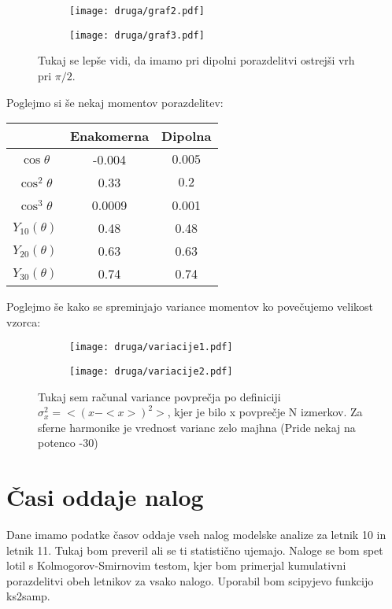 \documentclass{article}
\begin{document}
\begin{figure}[H]
\centering
\begin{subfigure}{.49\textwidth}
\texttt{[image: druga/graf2.pdf]}
\end{subfigure}
\begin{subfigure}{.49\textwidth}
\texttt{[image: druga/graf3.pdf]}
\end{subfigure}
\caption*{Tukaj se lepše vidi, da imamo pri dipolni porazdelitvi ostrejši vrh pri $\pi/2$.}
\end{figure}

Poglejmo si še nekaj momentov porazdelitev:
\begin{center}
\begin{tabular}{|c|c|c|}
\hline
& Enakomerna & Dipolna \\ \hline
$\cos\theta$ & -0.004 & $0.005$\\ \hline
$\cos^2\theta$ & 0.33& $0.2$\\ \hline
$\cos^3\theta$ & 0.0009 &0.001\\ \hline
$Y_{10}(\theta)$ & 0.48 & 0.48\\ \hline
$Y_{20}(\theta)$ & 0.63 & 0.63\\ \hline
$Y_{30}(\theta)$ & 0.74 & 0.74 \\ \hline
\end{tabular}
\end{center}

Poglejmo še kako se spreminjajo variance momentov ko povečujemo velikost vzorca:

\begin{figure}[H]
\centering
\begin{subfigure}{.49\textwidth}
\texttt{[image: druga/variacije1.pdf]}
\end{subfigure}
\begin{subfigure}{.49\textwidth}
\texttt{[image: druga/variacije2.pdf]}
\end{subfigure}
\caption*{Tukaj sem računal variance povprečja po definiciji $\sigma^2_x = <(x-<x>)^2>$, kjer je bilo x povprečje N izmerkov. Za sferne harmonike je vrednost varianc zelo majhna (Pride nekaj na potenco -30)}
\end{figure}

\section{Časi oddaje nalog}

Dane imamo podatke časov oddaje vseh nalog modelske analize za letnik 10 in letnik 11. Tukaj bom preveril ali se ti statistično ujemajo.
Naloge se bom spet lotil s Kolmogorov-Smirnovim testom, kjer bom primerjal kumulativni porazdelitvi obeh letnikov za vsako nalogo. Uporabil bom scipyjevo 
funkcijo ks2samp.
\end{document}
